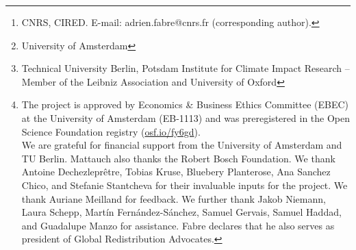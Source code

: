 \author{Adrien Fabre\footnote{CNRS, CIRED. E-mail: adrien.fabre@cnrs.fr (corresponding author).}, Thomas Douenne\footnote{University of Amsterdam}\; and Linus Mattauch\footnote{Technical University Berlin, Potsdam Institute for Climate Impact Research -- Member of the Leibniz Association and University of Oxford}~~\thanks{The project is approved by Economics \& Business Ethics Committee (EBEC) at the University of Amsterdam (EB-1113) and %
was preregistered in the Open Science Foundation registry (\href{https://osf.io/fy6gd}{osf.io/fy6gd}). \\ We are grateful for financial support from the University of Amsterdam and TU Berlin. Mattauch also thanks the Robert Bosch Foundation. %
We thank Antoine Dechezleprêtre, Tobias Kruse, Bluebery Planterose, Ana Sanchez Chico, and Stefanie Stantcheva for their invaluable inputs for the project. We thank Auriane Meilland for feedback. We further thank Jakob Niemann, Laura Schepp, Martín Fernández-Sánchez, Samuel Gervais, Samuel Haddad, and Guadalupe Manzo for assistance. Fabre declares that he also serves as president of Global Redistribution Advocates.}} %

\date{\today} %



\maketitle

\begin{center}
\end{center}




